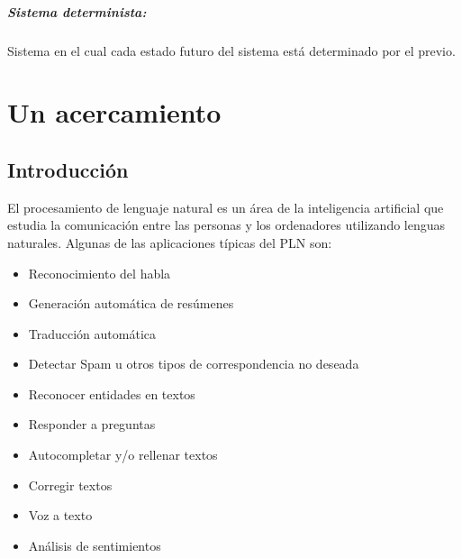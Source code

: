 \documentclass{report}
\def\profundidadIndiceCapitulo{subsubsection}
\begin{document}
\paragraph{Sistema determinista:} Sistema en el cual cada estado futuro del sistema está determinado por el previo. \autocite{wikipedia.es.sistemadeterminista}



\chapter{Un acercamiento}
\etocframedstyle[1]{}
\etocsetnexttocdepth{\profundidadIndiceCapitulo}
\localtableofcontents
\section{Introducción}
El procesamiento de lenguaje natural es un área de la
inteligencia artificial que estudia la comunicación entre las
personas y los ordenadores utilizando lenguas naturales.
Algunas de las aplicaciones típicas del PLN son:
\begin{itemize}
    \item Reconocimiento del habla
    \item Generación automática de resúmenes
    \item Traducción automática
    \item Detectar Spam u otros tipos de correspondencia no deseada
    \item Reconocer entidades en textos
    \item Responder a preguntas
    \item Autocompletar y/o rellenar textos
    \item Corregir textos
    \item Voz a texto
    \item Análisis de sentimientos
\end{itemize}
\end{document}
